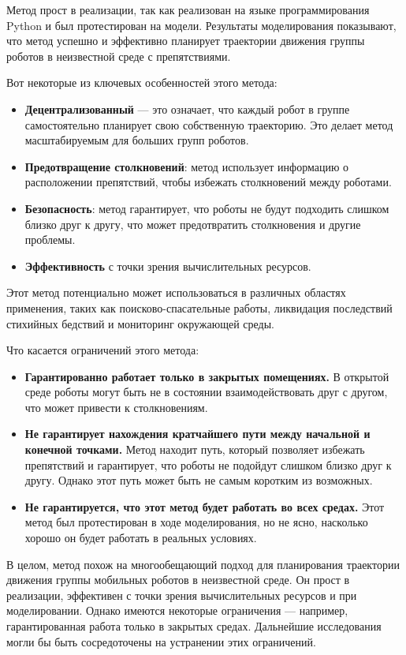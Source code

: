 \documentclass[russian,11pt]{article}
\begin{document}
Метод прост в реализации, так как реализован на языке программирования Python и был протестирован на модели. Результаты моделирования показывают, что метод успешно и эффективно планирует траектории движения группы роботов в неизвестной среде с препятствиями.

Вот некоторые из ключевых особенностей этого метода:
\begin{itemize}
\item \textbf{Децентрализованный} --- это означает, что каждый робот в группе самостоятельно планирует свою собственную траекторию. Это делает метод масштабируемым для больших групп роботов.
\item \textbf{Предотвращение столкновений}: метод использует информацию о расположении препятствий, чтобы избежать столкновений между роботами.
\item \textbf{Безопасность}: метод гарантирует, что роботы не будут подходить слишком близко друг к другу, что может предотвратить столкновения и другие проблемы.
\item \textbf{Эффективность} с точки зрения вычислительных ресурсов.
\end{itemize}

Этот метод потенциально может использоваться в различных областях применения, таких как поисково-спасательные работы, ликвидация последствий стихийных бедствий и мониторинг окружающей среды.

Что касается ограничений этого метода:
\begin{itemize}
\item \textbf{Гарантированно работает только в закрытых помещениях.} В открытой среде роботы могут быть не в состоянии взаимодействовать друг с другом, что может привести к столкновениям.
\item \textbf{Не гарантирует нахождения кратчайшего пути между начальной и конечной точками.} Метод находит путь, который позволяет избежать препятствий и гарантирует, что роботы не подойдут слишком близко друг к другу. Однако этот путь может быть не самым коротким из возможных.
\item\textbf{Не гарантируется, что этот метод будет работать во всех средах.} Этот метод был протестирован в ходе моделирования, но не ясно, насколько хорошо он будет работать в реальных условиях.
\end{itemize}

В целом, метод похож на многообещающий подход для планирования траектории движения группы мобильных роботов в неизвестной среде. Он прост в реализации, эффективен с точки зрения вычислительных ресурсов и при моделировании. Однако имеются некоторые ограничения --- например, гарантированная работа только в закрытых средах. Дальнейшие исследования могли бы быть сосредоточены на устранении этих ограничений.
\end{document}
